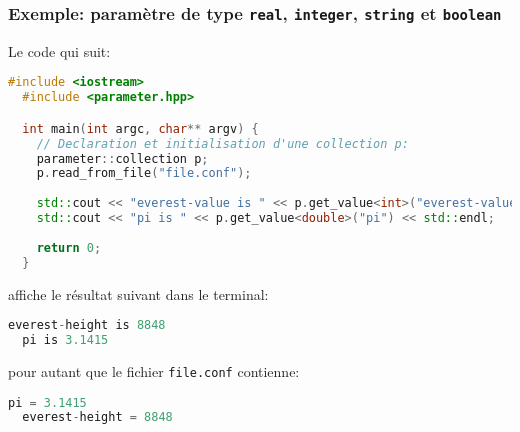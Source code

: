 \subsubsection{Exemple: param\`etre de type \texttt{real}, \texttt{integer},
  \texttt{string} et \texttt{boolean}}
Le code qui suit:
\begin{lstlisting}[language=c++,frame=single,basicstyle=\ttfamily\footnotesize]
  #include <iostream>
  #include <parameter.hpp> 

  int main(int argc, char** argv) {
    // Declaration et initialisation d'une collection p:
    parameter::collection p;
    p.read_from_file("file.conf");
    
    std::cout << "everest-value is " << p.get_value<int>("everest-value") << std::endl;
    std::cout << "pi is " << p.get_value<double>("pi") << std::endl;
    
    return 0;
  }
\end{lstlisting}
affiche le r\'esultat suivant dans le terminal:
\begin{lstlisting}[language=c++,frame=single,basicstyle=\ttfamily\footnotesize]
  everest-height is 8848
  pi is 3.1415
\end{lstlisting}
pour autant que le fichier \texttt{file.conf} contienne:
\begin{lstlisting}[language=c++,frame=single,basicstyle=\ttfamily\footnotesize]
  pi = 3.1415
  everest-height = 8848
\end{lstlisting}

